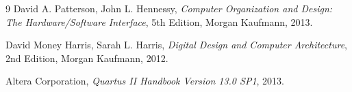 \documentclass[12pt,a4paper]{report}
\begin{document}
\begin{thebibliography}{9}
David A. Patterson, John L. Hennessy, \textit{Computer Organization and Design: The Hardware/Software Interface}, 5th Edition, Morgan Kaufmann, 2013.

David Money Harris, Sarah L. Harris, \textit{Digital Design and Computer Architecture}, 2nd Edition, Morgan Kaufmann, 2012.

Altera Corporation, \textit{Quartus II Handbook Version 13.0 SP1}, 2013.
\end{thebibliography}
\end{document}
